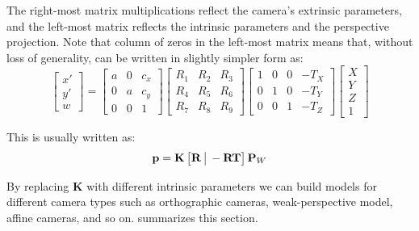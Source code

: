 The right-most matrix multiplications reflect the camera's extrinsic parameters, and the left-most matrix reflects the intrinsic parameters and the perspective projection.  Note that column of zeros in the left-most matrix means that, without loss of generality, \eqn{\ref{eq:combinedexpanded}} can be written in slightly simpler form as:
\begin{equation}
    \begin{bmatrix}
    x' \\
    y' \\
    w
    \end{bmatrix}
=
    \begin{bmatrix}
    a & 0 & c_x  \\
    0 & a & c_y  \\
    0 & 0 & 1 
    \end{bmatrix}
    \begin{bmatrix}
    R_1 & R_2 & R_3   \\
    R_4 & R_5 & R_6  \\
    R_7 & R_8 & R_9 
    \end{bmatrix}
    \begin{bmatrix}
    1 & 0 & 0 & -T_X \\
    0 & 1 & 0 & -T_Y \\
    0 & 0 & 1 & -T_Z
    \end{bmatrix}
    \begin{bmatrix}
    X \\
    Y \\
    Z \\
    1
    \end{bmatrix}
    \label{eq:combinedexpandedsmaller}
\end{equation}

This is usually written as:
\begin{equation}
\mathbf{p} = 
    \mathbf{K}
    \begin{bmatrix}
    \mathbf{R} ~ \vline ~ -\mathbf{R} \mathbf{T} 
    \end{bmatrix}
    \mathbf{P}_W 
\end{equation}


By replacing $\mathbf{K}$ with different intrinsic parameters we can build models for different camera types such as orthographic cameras, weak-perspective model, affine cameras, and so on. \Fig{\ref{fig:summary_camera_projection}} summarizes this section.


